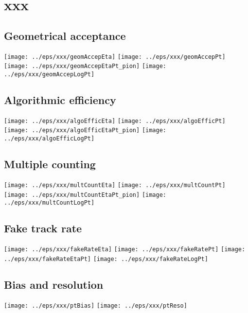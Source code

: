 \section{xxx}

\subsection{Geometrical acceptance}
 \texttt{[image: ../eps/xxx/geomAccepEta]}
 \texttt{[image: ../eps/xxx/geomAccepPt]}
 \texttt{[image: ../eps/xxx/geomAccepEtaPt\_pion]}
 \texttt{[image: ../eps/xxx/geomAccepLogPt]}
 \newpage
 
\subsection{Algorithmic efficiency}
 \texttt{[image: ../eps/xxx/algoEfficEta]}
 \texttt{[image: ../eps/xxx/algoEfficPt]}
 \texttt{[image: ../eps/xxx/algoEfficEtaPt\_pion]}
 \texttt{[image: ../eps/xxx/algoEfficLogPt]}
 \newpage

\subsection{Multiple counting}
 \texttt{[image: ../eps/xxx/multCountEta]}
 \texttt{[image: ../eps/xxx/multCountPt]}
 \texttt{[image: ../eps/xxx/multCountEtaPt\_pion]}
 \texttt{[image: ../eps/xxx/multCountLogPt]}
 \newpage

\subsection{Fake track rate}
 \texttt{[image: ../eps/xxx/fakeRateEta]}
 \texttt{[image: ../eps/xxx/fakeRatePt]}
 \texttt{[image: ../eps/xxx/fakeRateEtaPt]}
 \texttt{[image: ../eps/xxx/fakeRateLogPt]}
 \newpage

\subsection{Bias and resolution}
 \texttt{[image: ../eps/xxx/ptBias]}
 \texttt{[image: ../eps/xxx/ptReso]}
 \newpage

